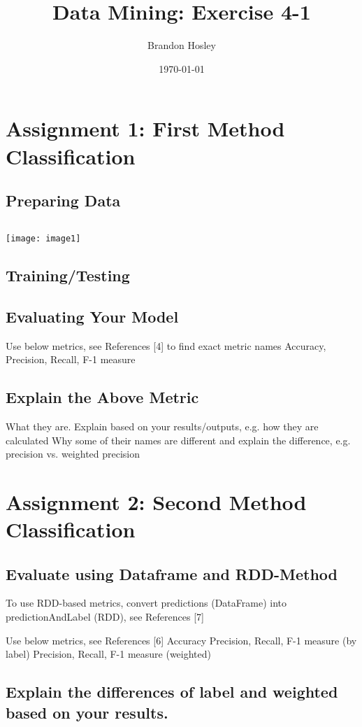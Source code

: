 \documentclass[]{article}
\title{Data Mining: Exercise 4-1}
\author{Brandon Hosley}
\date{\today}
\begin{document}
\maketitle

\section*{Assignment 1: First Method Classification}

\subsection*{Preparing Data}
\begin{verbatim}
\end{verbatim}
\texttt{[image: image1]}


\subsection*{Training/Testing}


\subsection*{Evaluating Your Model}
Use below metrics, see References [4] to find exact metric names
Accuracy, Precision, Recall, F-1 measure

\subsection*{Explain the Above Metric}
What they are. Explain based on your results/outputs, e.g. how they are calculated
Why some of their names are different and explain the difference, e.g. precision vs. weighted precision

\section*{Assignment 2: Second Method Classification}

\subsection*{Evaluate using Dataframe and RDD-Method}
To use RDD-based metrics, convert predictions (DataFrame) into predictionAndLabel (RDD), see References [7]

Use below metrics, see References [6]
	Accuracy
	Precision, Recall, F-1 measure (by label)
	Precision, Recall, F-1 measure (weighted)

\subsection*{Explain the differences of label and weighted based on your results.}
\end{document}
